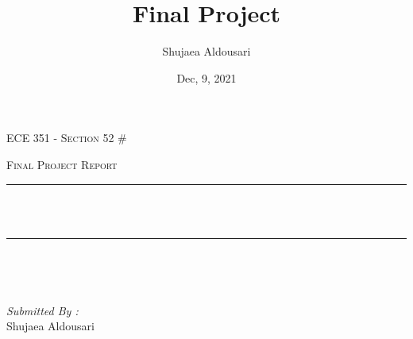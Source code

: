 \documentclass[12pt]{report}
\title{Final Project}
\author{ Shujaea Aldousari}
\date{Dec, 9, 2021}
\makeatletter
\let\thetitle\@title
\makeatother
\begin{document}

\begin{titlepage}
	\centering
    \vspace*{0.5 cm}
\begin{center}    \textsc{\Large   ECE 351 - Section 52 \# }\\[2.0 cm]	\end{center}%
	\textsc{\Large  Final Project Report  }\\[0.5 cm]				%
	\rule{\linewidth}{0.2 mm} \\[0.4 cm]
	{ \huge \bfseries \thetitle}\\
	\rule{\linewidth}{0.2 mm} \\[1.5 cm]
	
	\begin{minipage}{0.4\textwidth}
		\begin{flushleft} \large
			\end{flushleft}
			\end{minipage}~
			\begin{minipage}{0.4\textwidth}
            
			\begin{flushright} \large
			\emph{Submitted By :} \\
			Shujaea Aldousari  
		\end{flushright}
           
	\end{minipage}\\[2 cm]
	
    
    
    
    
	
\end{titlepage}


\tableofcontents
\pagebreak

\renewcommand{\thesection}{\arabic{section}}
\end{document}
